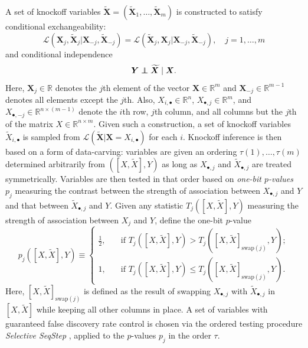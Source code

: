 \documentclass[12pt]{article}
\theoremstyle{definition}
\theoremstyle{remark}
\def\independenT#1#2{\mathrel{\rlap{$#1#2$}\mkern2mu{#1#2}}}
\newcommand\independent{\protect\mathpalette{\protect\independenT}{\perp}}
\newcommand{\prx}{\bm X}
\newcommand{\srx}{X}
\newcommand{\prxk}{{{\widetilde{\bm X}}}}
\newcommand{\srxk}{\widetilde X}
\newcommand{\pry}{{\bm Y}}
\newcommand{\sry}{Y}
\begin{document}
A set of knockoff variables $\prxk = (\prxk_1, \dots, \prxk_m)$ is constructed to satisfy conditional exchangeability:
\begin{equation}
\mathcal L(\prx_j, \prxk_j | \prx_{-j}, \prxk_{-j}) = \mathcal L(\prxk_j, \prx_j | \prx_{-j}, \prxk_{-j}), \quad j = 1, \dots, m
\label{conditional-exchangeability}
\end{equation}
and conditional independence 
\begin{equation}
\pry \independent \prxk \mid \prx.
\label{knockoff-conditional-independence}
\end{equation}
Here, $\prx_j \in \mathbb R$ denotes the $j$th element of the vector $\prx \in \mathbb R^m$ and $\prx_{-j} \in \mathbb R^{m-1}$ denotes all elements except the $j$th. Also, $\srx_{i,\bullet} \in \mathbb R^{n}$, $\srx_{\bullet, j} \in \mathbb R^m$, and $\srx_{\bullet, -j} \in \mathbb R^{n \times (m-1)}$ denote the $i$th row, $j$th column, and all columns but the $j$th of the matrix $\srx \in \mathbb R^{n \times m}$. Given such a construction, a set of knockoff variables $\srxk_{i,\bullet}$ is sampled from  $\mathcal L(\prxk|\prx = \srx_{i,\bullet})$ for each $i$. Knockoff inference is then based on a form of data-carving: variables are given an ordering $\tau(1), \dots, \tau(m)$ determined arbitrarily from $([\srx, \srxk], \sry)$ as long as $\srx_{\bullet, j}$ and $\srxk_{\bullet, j}$ are treated symmetrically. Variables are then tested in that order based on \textit{one-bit $p$-values} $p_j$ measuring the contrast between the strength of association between $\srx_{\bullet, j}$ and $\sry$ and that between $\srxk_{\bullet, j}$ and $\sry$. Given any statistic $T_j([\srx, \srxk], \sry)$ measuring the strength of association between $\srx_j$ and $\sry$, define the one-bit $p$-value
\begin{equation}
p_j([\srx, \srxk], \sry) \equiv 
\begin{cases}
\frac12, \quad &\text{if } T_j([\srx, \srxk], \sry) > T_j([\srx, \srxk]_{\text{swap}(j)}, \sry);  \\
1, \quad &\text{if } T_j([\srx, \srxk], \sry) \leq T_j([\srx, \srxk]_{\text{swap}(j)}, \sry).
\end{cases}
\label{one-bit-pvalue}
\end{equation}
Here, $[\srx, \srxk]_{\text{swap}(j)}$ is defined as the result of swapping $\srx_{\bullet, j}$ with $\srxk_{\bullet, j}$ in $[\srx, \srxk]$ while keeping all other columns in place. A set of variables with guaranteed false discovery rate control is chosen via the ordered testing procedure \textit{Selective SeqStep} \cite{BC15}, applied to the $p$-values $p_j$ in the order $\tau$.
\end{document}
